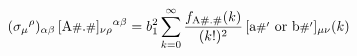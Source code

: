 \begin{equation}
(\sigma_{\mu}{}^{\rho})_{\alpha\beta}\,
[\mbox{A{\footnotesize\#}.{\footnotesize\#}}]_{\nu\rho}{}^{\alpha\beta} =
 b_1^2 \sum_{k=0}^\infty \frac{f_{\mathrm{A\#.\#}}(k)}{(k!)^2}  \,
[\mbox{a{\footnotesize\#$'$} or b{\footnotesize\#$'$}}]_{\mu\nu}(k) 
\end{equation}

